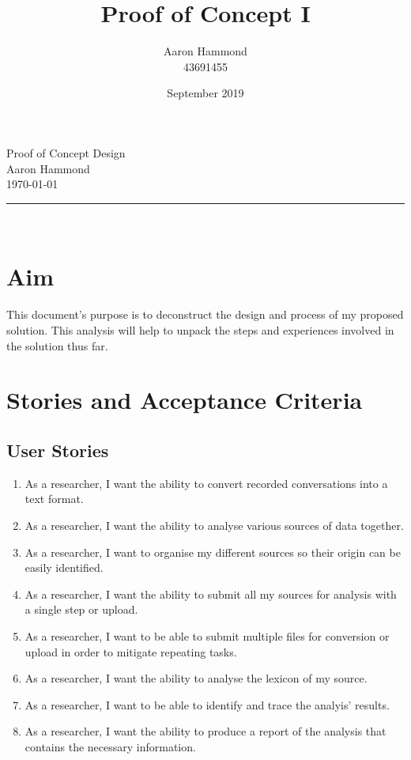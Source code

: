 \documentclass{article}
\title{Proof of Concept I}
\author{Aaron Hammond\\43691455}
\date{September 2019}
\newcommand\HRule{\rule{\textwidth}{1pt}} %
\begin{document}
\begin{center}
\huge{Proof of Concept Design}\\[0.4cm]
\huge{Aaron Hammond}\\[0.3cm]
\large{\today}\\[0.4cm]

\HRule \\[1cm]
\end{center}

\section{Aim}
This document's purpose is to deconstruct the design and process of my proposed solution. This analysis will help to unpack the steps and experiences involved in the solution thus far.

\section{Stories and Acceptance Criteria}
\subsection{User Stories}
\begin{enumerate}
    
    \item As a researcher, I want the ability to convert recorded conversations into a text format.
    
    \item As a researcher, I want the ability to analyse various sources of data together.
    
    \item As a researcher, I want to organise my different sources so their origin can be easily identified.
    
    \item As a researcher, I want the ability to submit all my sources for analysis with a single step or upload.
    
    \item As a researcher, I want to be able to submit multiple files for conversion or upload in order to mitigate repeating tasks.
    
    \item As a researcher, I want the ability to analyse the lexicon of my source.
    
    \item As a researcher, I want to be able to identify and trace the analyis' results.
    
    \item As a researcher, I want the ability to produce a report of the analysis that contains the necessary information.
    
\end{enumerate}
\end{document}
